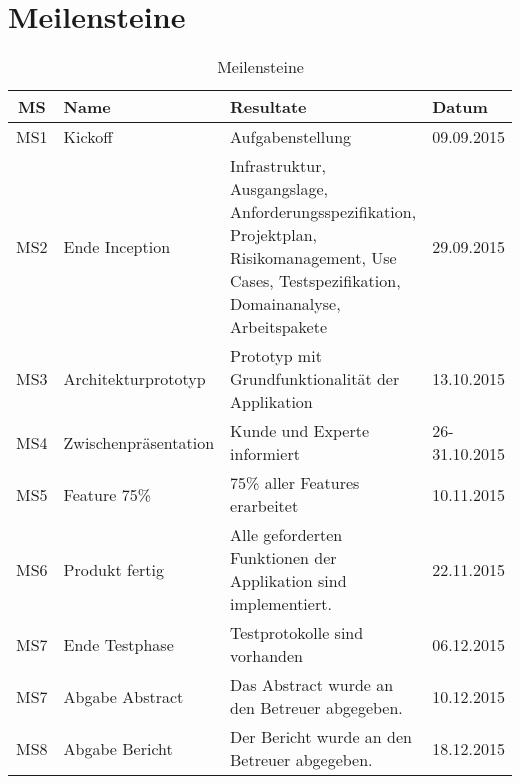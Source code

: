 
\section{Meilensteine}
\label{sec:Meilensteine}


\begin{table}[H]
\begin{tabularx}{\textwidth}{ c | l | X | l}
\textbf{MS} & \textbf{Name} & \textbf{Resultate}  & \textbf{Datum} \\ \hline
MS1 & Kickoff              & Aufgabenstellung & 09.09.2015 \\ \hline
MS2 & Ende Inception       & Infrastruktur, Ausgangslage, Anforderungsspezifikation, Projektplan, Risikomanagement, Use Cases, Testspezifikation, Domainanalyse, Arbeitspakete	& 29.09.2015 \\ \hline
MS3 & Architekturprototyp  & Prototyp mit Grundfunktionalität der Applikation	& 13.10.2015 \\ \hline
MS4 & Zwischenpräsentation & Kunde und Experte informiert & 26-31.10.2015 \\ \hline
MS5 & Feature 75\%         & 75\% aller Features erarbeitet & 10.11.2015 \\ \hline
MS6 & Produkt fertig       & Alle geforderten Funktionen der Applikation sind implementiert. & 22.11.2015 \\ \hline
MS7 & Ende Testphase       & Testprotokolle sind vorhanden & 06.12.2015 \\ \hline
MS7 & Abgabe Abstract      & Das Abstract wurde an den Betreuer abgegeben. & 10.12.2015 \\ \hline
MS8 & Abgabe Bericht       & Der Bericht wurde an den Betreuer abgegeben. & 18.12.2015 \\
\end{tabularx}
\caption{Meilensteine}
\end{table}

\pagebreak